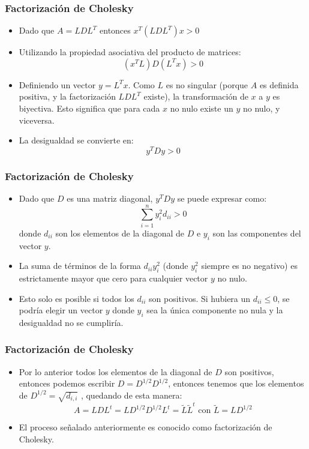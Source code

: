 \documentclass{beamer}
\begin{document}
\begin{frame}
  \frametitle{Factorizaci\'on de Cholesky}
  \begin{itemize}
    \item<1-> Dado que $A=LDL^T$ entonces $x^T(LDL^T)x > 0$
    \item<2-> Utilizando la propiedad asociativa del producto de matrices:
    $$
    (x^TL)D(L^Tx) > 0
    $$
    \item<3-> Definiendo un vector $y = L^Tx$. Como $L$ es no singular (porque $A$ es definida positiva, y la factorización $LDL^T$ existe), la transformaci\'on de $x$ a $y$ es biyectiva. Esto significa que para cada $x$ no nulo existe un $y$ no nulo, y viceversa.
    \item<4-> La desigualdad se convierte en:
    $$
    y^TDy > 0
    $$
  \end{itemize}
\end{frame}
\begin{frame}
  \frametitle{Factorizaci\'on de Cholesky}
  \begin{itemize}
    \item<1-> Dado que $D$ es una matriz diagonal, $y^TDy$ se puede expresar como:
    $$
    \sum_{i=1}^n y_i^2d_{ii} > 0
    $$
    donde $d_{ii}$ son los elementos de la diagonal de $D$ e $y_i$ son las componentes del vector $y$.
    \item<2-> La suma de t\'erminos de la forma $d_{ii}y_i^2$ (donde $y_i^2$ siempre es no negativo) es estrictamente mayor que cero para cualquier vector $y$ no nulo.
    \item<3-> Esto solo es posible si todos los $d_{ii}$ son positivos. Si hubiera un $d_{ii} \leq 0$, se podría elegir un vector $y$ donde $y_i$ sea la \'unica componente no nula y la desigualdad no se cumpliría.    
  \end{itemize}  
\end{frame}
\begin{frame}
  \frametitle{Factorizaci\'on de Cholesky}
  \begin{itemize}
    \item<1-> Por lo anterior todos los elementos de la diagonal de $D$ son positivos, entonces podemos escribir $D=D^{1/2}D^{1/2}$,
    entonces tenemos que los elementos de $D^{1/2}=\sqrt{d_{i,i}}$ , quedando de esta manera:
    $$
      A = LDL^t = LD^{1/2}D^{1/2}L^t = \tilde L\tilde L^t \mbox{ con } \tilde L = LD^{1/2}
    $$    
    \item El proceso se\~nalado anteriormente es conocido como factorizaci\'on de Cholesky.
   \end{itemize}
\end{frame}
\end{document}
